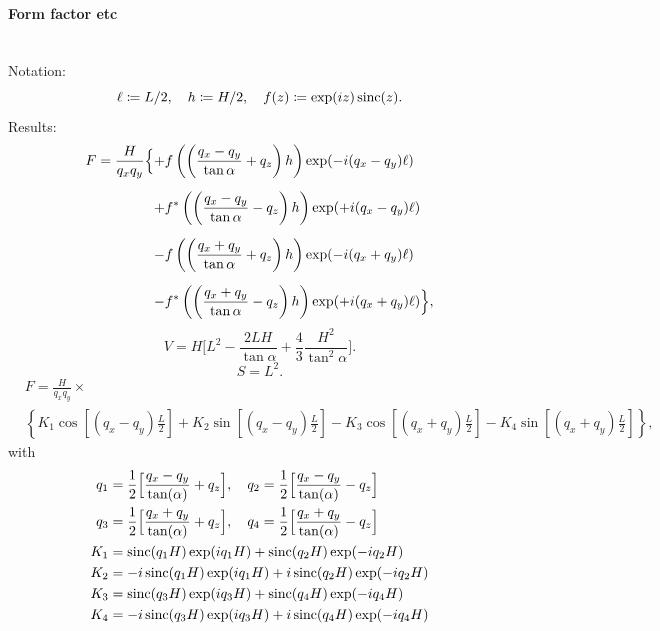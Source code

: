 \paragraph{Form factor etc}\strut\\
Notation:
\begin{displaymath}
  \ell\coloneqq L/2,\quad
  h\coloneqq H/2,\quad
  f(z)\coloneqq \exp(i z)\operatorname{sinc}(z).
\end{displaymath}
Results:
\begin{equation*}
\begin{array}{@{}l@{}l@{}}
\DS F=
\frac{H}{q_xq_y} \Big\{
   &+\DS  f\left(\left(\frac{q_x-q_y}{\tan\alpha} +q_z\right)h\right)
        \exp(-i(q_x-q_y)\ell)
\\[3.6ex]
   &\DS+ f^*\left(\left(\frac{q_x-q_y}{\tan\alpha} -q_z\right)h\right)
        \exp(+i(q_x-q_y)\ell)
\\[3.6ex]
   &\DS- f\left(\left(\frac{q_x+q_y}{\tan\alpha} +q_z\right)h\right)
        \exp(-i(q_x+q_y)\ell)
\\[3.6ex]
   &\DS- f^*\left(\left(\frac{q_x+q_y}{\tan\alpha} -q_z\right)h\right)
        \exp(+i(q_x+q_y)\ell)
\Big\},
\end{array}
\end{equation*}
\begin{equation*}
  V= H \Big[L^2 - \frac{2LH}{\tan\alpha} + \dfrac{4}{3} \dfrac{H^2}{\tan^2\alpha}\Big].
\end{equation*}
\begin{equation*}
  S=L^2.
\end{equation*}
\begin{align*}
&F = 
\frac{H}{q_x q_y} \times \nonumber \\ &\left\{ K_1 \cos\left[
  (q_x-q_y)\frac{L}{2} \right] + K_2 \sin\left[ (q_x-q_y)\frac{L}{2} \right]
- K_3 \cos\left[ (q_x+q_y) \frac{L}{2} \right] - K_4 \sin\left[ (q_x+q_y)\frac{L}{2} \right]\right\},
\end{align*}
with
\begin{align*}
       q_1 &=\frac{1}{2}\Big[\frac{q_x-q_y}{\tan(\alpha)} + q_z\Big],\quad       q_2 =\frac{1}{2}\Big[\frac{q_x-q_y}{\tan(\alpha)} - q_z\Big]\\
        q_3 &=\frac{1}{2}\Big[\frac{q_x+q_y}{\tan(\alpha)} + q_z\Big],\quad       q_4 =\frac{1}{2}\Big[\frac{q_x+q_y}{\tan(\alpha)} - q_z\Big]\\
        K_1 &= \operatorname{sinc}(q_1 H)\exp(i q_1 H)  + \operatorname{sinc}(q_2 H) \exp(-i q_2 H)\\
        K_2 &= -i \operatorname{sinc}(q_1 H) \exp(i q_1 H) +i \operatorname{sinc}(q_2 H) \exp(-i q_2 H)\\
        K_3 &= \operatorname{sinc}(q_3 H) \exp(i q_3 H)    + \operatorname{sinc}(q_4 H) \exp(-i q_4 H)\\
        K_4 &= -i \operatorname{sinc}(q_3 H) \exp(i q_3 H) + i \operatorname{sinc}(q_4 H) \exp(-i q_4 H) 
   \end{align*}

